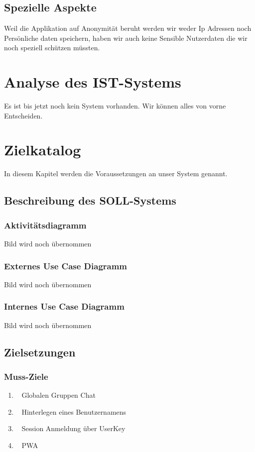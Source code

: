 \documentclass[12pt]{article}
\begin{document}
    \subsection{Spezielle Aspekte}
      Weil die Applikation auf Anonymität beruht werden wir weder Ip Adressen noch Persönliche daten speichern,
      haben wir auch keine Sensible Nutzerdaten die wir noch speziell schützen müssten.

  \section{Analyse des IST-Systems}
    Es ist bis jetzt noch kein System vorhanden. Wir können alles von vorne Entscheiden.

  \section{Zielkatalog}
    In diesem Kapitel werden die Voraussetzungen an unser System genannt.

    \subsection{Beschreibung des SOLL-Systems}
      \subsubsection{Aktivitätsdiagramm}
        Bild wird noch übernommen
      \subsubsection{Externes Use Case Diagramm}
        Bild wird noch übernommen
      \subsubsection{Internes Use Case Diagramm}
        Bild wird noch übernommen

    \subsection{Zielsetzungen}
      \subsubsection{Muss-Ziele}
        \begin{enumerate}
          \item \faGlobe~ Globalen Gruppen Chat
          \item \faUser~ Hinterlegen eines Benutzernamens
          \item \faKey~ Session Anmeldung über UserKey
          \item \faMobile~ PWA
        \end{enumerate}
\end{document}
